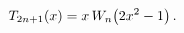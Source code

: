\[\mathop{T_{2n+1}\/}\nolimits\!\left(x\right)=x\mathop{W_{n}\/}\nolimits\!\left%
(2x^{2}-1\right).\]